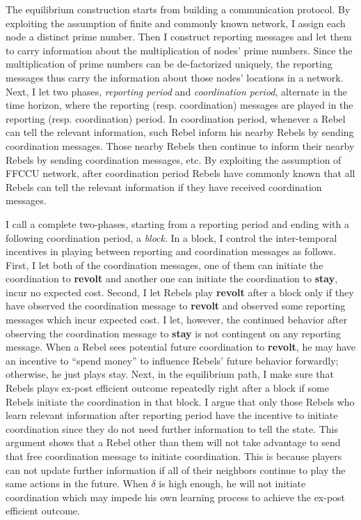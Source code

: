 \documentclass[12pt,letterpaper]{article}
\newtheorem*{main result}{Main Result}
\theoremstyle{definition}
\theoremstyle{remark}
\theoremstyle{claim}
\begin{document}
The equilibrium construction starts from building a communication protocol. By exploiting the assumption of finite and commonly known network, I assign each node a distinct prime number. Then I construct reporting messages and let them to carry information about the multiplication of nodes' prime numbers. Since the multiplication of prime numbers can be de-factorized uniquely, the reporting messages thus carry the information about those nodes' locations in a network. Next, I let two phases, \textit{reporting period} and \textit{coordination period}, alternate in the time horizon, where the reporting (resp. coordination) messages are played in the reporting (resp. coordination) period. In coordination period, whenever a Rebel can tell the relevant information, such Rebel inform his nearby Rebels by sending coordination messages. Those nearby Rebels then continue to inform their nearby Rebels by sending coordination messages, etc. By exploiting the assumption of FFCCU network, after coordination period Rebels have commonly known that all Rebels can tell the relevant information if they have received coordination messages.

I call a complete two-phases, starting from a reporting period and ending with a following coordination period, a \textit{block}. In a block, I control the inter-temporal incentives in playing between reporting and coordination messages as follows. First, I let both of the coordination messages, one of them can initiate the coordination to \textbf{revolt} and another one can initiate the coordination to \textbf{stay}, incur no expected cost. Second, I let Rebels play \textbf{revolt} after a block only if they have observed the coordination message to \textbf{revolt} and observed some reporting messages which incur expected cost. I let, however, the continued behavior after observing the coordination message to \textbf{stay} is not contingent on any reporting message. When a Rebel sees potential future coordination to \textbf{revolt}, he may have an incentive to ``spend money'' to influence Rebels' future behavior forwardly; otherwise, he just plays stay. Next, in the equilibrium path, I make sure that Rebels plays ex-post efficient outcome repeatedly right after a block if some Rebels initiate the coordination in that block. I argue that only those Rebels who learn relevant information after reporting period have the incentive to initiate coordination since they do not need further information to tell the state. This argument shows that a Rebel other than them will not take advantage to send that free coordination message to initiate coordination. This is because players can not update further information if all of their neighbors continue to play the same actions in the future. When $\delta$ is high enough, he will not initiate coordination which may impede his own learning process to achieve the ex-post efficient outcome.
\end{document}
